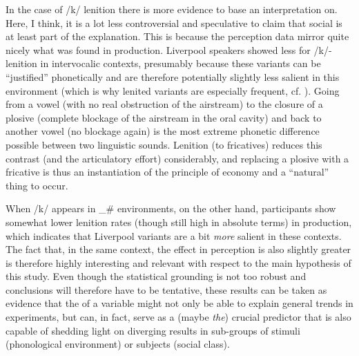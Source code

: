 In the case of /k/ lenition there is more evidence to base an interpretation on.
Here, I think, it is a lot less controversial and speculative to claim that social  is at least part of the explanation.
This is because the perception data mirror quite nicely what was found in production.
Liverpool speakers showed less  for /k/-lenition in intervocalic contexts, presumably because these variants can be ``justified'' phonetically and are therefore potentially slightly less salient in this environment (which is why lenited variants are especially frequent, cf. ).
Going from a vowel (with no real obstruction of the airstream) to the closure of a plosive (complete blockage of the airstream in the oral cavity) and back to another vowel (no blockage again) is the most extreme phonetic difference possible between two linguistic sounds.
Lenition (to fricatives) reduces this contrast (and the articulatory effort) considerably, and replacing a plosive with a fricative is thus an instantiation of the principle of economy and a ``natural'' thing to occur.

When /k/ appears in \_\# environments, on the other hand, participants show somewhat lower lenition rates (though still high in absolute terms) in production, which indicates that Liverpool variants are a bit \emph{more} salient in these contexts.
The fact that, in the same context, the  effect in perception is also slightly greater is therefore highly interesting and relevant with respect to the main hypothesis of this study.
Even though the statistical grounding is not too robust and conclusions will therefore have to be tentative, these results can be taken as evidence that the  of a variable might not only be able to explain general trends in   experiments, but can, in fact, serve as a (maybe \emph{the}) crucial predictor that is also capable of shedding light on diverging results in sub-groups of stimuli (phonological environment) or subjects (social class).

